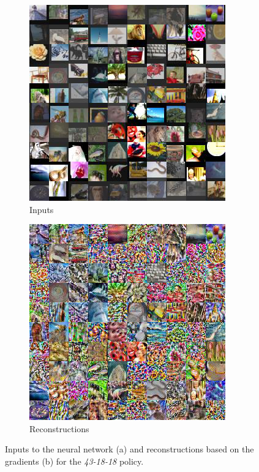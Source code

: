\begin{figure}[hbt!]
\begin{subfigure}{.49\linewidth}\centering
\includegraphics[width=\textwidth]{grids/data_cifar100_arch_ResNet20-4_epoch_200_optim_inversed_mode_aug_auglist_43-18-18_rlabel_False_ORIGINALS.png}
\caption{Inputs}%
\end{subfigure}%
\hfill
\begin{subfigure}{.49\linewidth}\centering
\includegraphics[width=\textwidth]{grids/data_cifar100_arch_ResNet20-4_epoch_200_optim_inversed_mode_aug_auglist_43-18-18_rlabel_False_RECONSTRUCTIONS.png}
\caption{Reconstructions}%
\end{subfigure}%
\caption{Inputs to the neural network (a) and reconstructions based on the gradients (b) for the \textit{43-18-18} policy.}
    \label{fig:apprr}
\end{figure}
